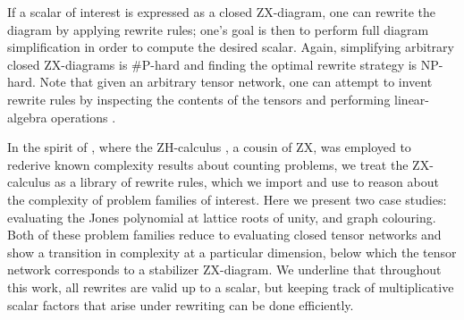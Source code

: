 If a scalar of interest is expressed as a closed ZX-diagram,
one can rewrite the diagram by applying rewrite rules; one's goal is then to perform full diagram simplification in order to compute the desired scalar.
Again, simplifying arbitrary closed ZX-diagrams is \#P-hard and finding the optimal rewrite strategy is NP-hard.
Note that
given an arbitrary tensor network, one can attempt to invent rewrite rules by inspecting the contents of the tensors and performing linear-algebra operations \cite{gray2020hyperoptimized}.



In the spirit of \cite{debeaudrap2020tensor},
where the ZH-calculus \cite{backens2018zh}, a cousin of ZX, was employed to rederive known complexity results about counting problems, we treat the ZX-calculus as a library of rewrite rules, which we import and use to reason about the complexity of problem families of interest.
Here we present two case studies: evaluating the Jones polynomial at lattice roots of unity, and graph colouring.
Both of these problem families reduce to evaluating
closed tensor networks and show a transition in complexity
at a particular dimension, below which the tensor network corresponds to a stabilizer ZX-diagram.
We underline that throughout this work, all rewrites are valid
up to a scalar, but keeping track of multiplicative scalar factors that arise under rewriting can be done efficiently.

